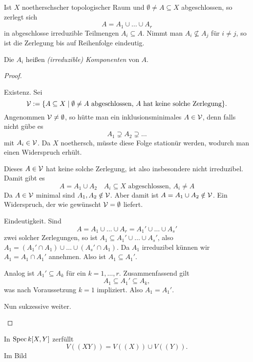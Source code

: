 \begin{satz}
	Ist $X$ noetherschscher topologischer Raum und 
	$\emptyset \neq A \subseteq X$ abgeschlossen, so zerlegt sich
	\[
		A = A_1 \cup \ldots \cup A_r
	\]
	in abgeschlosse irreduzible Teilmengen $A_i \subseteq A$.
	Nimmt man $A_i \not\subseteq A_j$ für $i\neq j$, so ist die Zerlegung
	bis auf Reihenfolge eindeutig.
	
	Die $A_i$ heißen \emph{(irreduzible) Komponenten} von $A$.
\end{satz}
\begin{proof}
	\begin{description sf}
	\item[Existenz.]
		Sei 
		\[
			\cal V := \{ A\subseteq X \mid \emptyset \neq A 
				\text{ abgeschlossen, $A$ hat keine solche Zerlegung} \}. 
		\]
		Angenommen $\cal V \neq\emptyset$, so hütte man
		ein inklusionsminimales $A \in \cal V$, denn falls nicht gübe es
		\[
			A_1 \supsetneq A_2 \supsetneq \ldots
		\]
		mit $A_i \in \cal V$. Da $X$ noethersch, müsste diese Folge
		stationür werden, wodurch man einen Widerspruch erhült.
		
		Dieses $A \in \cal V$ hat keine solche Zerlegung, ist also
		insbesondere nicht irreduzibel. Damit gibt es
		\[
			A = A_1 \cup A_2\quad A_i \subseteq X \text{ abgeschlossen, }
			A_i \neq A
		\]
		Da $A \in \cal V$ minimal sind $A_1, A_2 \notin \cal V$.
		Aber damit ist
		$A = A_1 \cup A_2 \notin \cal V$. Ein Widerspruch, der wie gewünscht
		$\cal V = \emptyset$ liefert.
	\item[Eindeutigkeit.]
		Sind 
		\[
			A = A_1 \cup \ldots \cup A_r = 
				A_1' \cup \ldots \cup A_s'
		\]
		zwei solcher Zerlegungen, so ist
		$A_1 \subseteq A_1' \cup \ldots \cup A_s'$, also
		$A_1 = (A_1' \cap A_1) \cup \ldots \cup (A_s' \cap A_1)$.
		Da $A_1$ irreduzibel künnen wir \obda $A_1 = A_1 \cap A_1'$ 
		annehmen. Also ist $A_1 \subseteq A_1'$.
		
		Analog ist $A_1' \subseteq A_k$ für ein $k=1,\ldots,r$.
		Zusammenfassend gilt
		\[
			A_1 \subseteq A_1' \subseteq A_k,
		\]
		was nach Voraussetzung $k = 1$ impliziert. Also $A_1 = A_1'$.
		
		Nun sukzessive weiter. 
	\end{description sf}
\end{proof}

\begin{beispiel}
	In $\Spec k[X,Y]$ zerfüllt
	\[
		V((XY)) = V((X)) \cup V((Y)).
	\]
	Im Bild
\end{beispiel}

